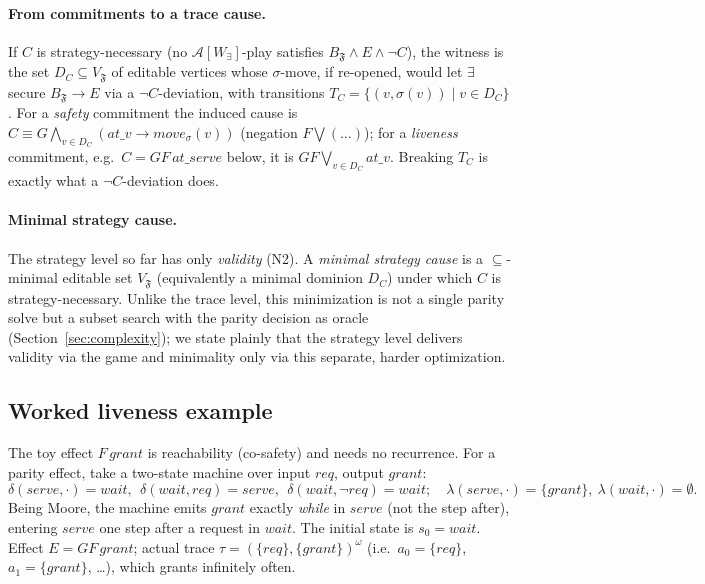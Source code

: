 \documentclass[11pt]{article}
\theoremstyle{remark}
\newcommand{\Frame}{\mathfrak{F}}
\begin{document}
\paragraph{From commitments to a trace cause.} If \(C\) is strategy-necessary
(no \(\mathcal{A}[W_\exists]\)-play satisfies \(B_{\Frame}\wedge E\wedge\neg C\)),
the witness is the set \(D_C\subseteq V_{\Frame}\) of editable vertices whose
\(\sigma\)-move, if re-opened, would let \(\exists\) secure
\(B_{\Frame}\rightarrow E\) via a \(\neg C\)-deviation, with
transitions \(T_C=\{(v,\sigma(v))\mid v\in D_C\}\). For a \emph{safety} commitment
the induced cause is \(C\equiv G\bigwedge_{v\in D_C}(\mathit{at\_}v\to
\mathit{move}_\sigma(v))\) (negation \(F\bigvee(\ldots)\)); for a \emph{liveness}
commitment, e.g.\ \(C=GF\,\mathit{at\_serve}\) below, it is
\(GF\bigvee_{v\in D_C}\mathit{at\_}v\). Breaking \(T_C\) is exactly what a
\(\neg C\)-deviation does.

\paragraph{Minimal strategy cause.} The strategy level so far has only
\emph{validity} (N2). A \emph{minimal strategy cause} is a \(\subseteq\)-minimal
editable set \(V_{\Frame}\) (equivalently a minimal dominion \(D_C\)) under which
\(C\) is strategy-necessary. Unlike the trace level, this minimization is not a
single parity solve but a subset search with the parity decision as oracle
(Section~\ref{sec:complexity}); we state plainly that the strategy level delivers
validity via the game and minimality only via this separate, harder optimization.

\subsection{Worked liveness example}
\label{sec:liveness-example}

The toy effect \(F\,grant\) is reachability (co-safety) and needs no recurrence.
For a parity effect, take a two-state machine over input \(req\), output \(grant\):
\[
  \delta(\mathit{serve},\cdot)=\mathit{wait},\ \
  \delta(\mathit{wait},req)=\mathit{serve},\ \
  \delta(\mathit{wait},\neg req)=\mathit{wait};\quad
  \lambda(\mathit{serve},\cdot)=\{grant\},\ \lambda(\mathit{wait},\cdot)=\emptyset.
\]
Being Moore, the machine emits \(grant\) exactly \emph{while} in \(\mathit{serve}\)
(not the step after), entering \(\mathit{serve}\) one step after a request in
\(\mathit{wait}\). The initial state is \(s_0=\mathit{wait}\). Effect \(E=GF\,grant\); actual trace
\(\tau=(\{req\},\{grant\})^\omega\) (i.e.\ \(a_0=\{req\}\), \(a_1=\{grant\}\),
\dots), which grants infinitely often.
\end{document}
